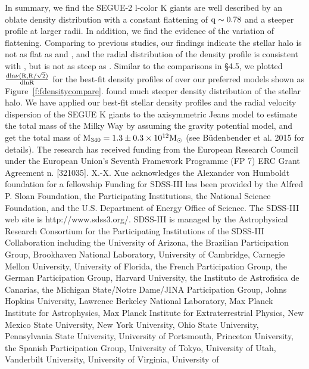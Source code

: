 \documentclass[12pt,preprint]{aastex}
\begin{document}
In summary, we find the SEGUE-2 l-color K giants are well described by an oblate density distribution with a constant flattening of $\rm q \sim 0.78$ and a steeper profile at larger radii. In addition, we find the evidence of the variation of flattening. Comparing to previous studies, our findings indicate the stellar halo is not as flat as \citet[;q=0.7]{Sesar2011} and \citet[;q=0.58]{Deason2011}, and the radial distribution of the density profile is consistent with \citet{Sesar2011}, but is not as steep as \citet{Deason2011,Deason2014}.
Similar to the comparisons in \S 4.5, we plotted $\rm \frac{dln\nu(R,R/\sqrt{2})}{dlnR}$ for the best-fit density profiles of \citet{Deason2011,Deason2014} over our preferred models shown as Figure~\ref{f:fdensitycompare}. \citet{Deason2011,Deason2014} found much steeper density distribution of the stellar halo.
We have applied our best-fit stellar density profiles and the radial velocity dispersion of the SEGUE K giants to the axisymmetric Jeans model to estimate the total mass of the Milky Way by assuming the gravity potential model, and get the total mass of $\rm M_{340}=1.3\pm0.3\times10^{12}M_\odot$ (see B\"{u}denbender et al. 2015 for details).
\acknowledgments
The research has received funding from the European Research Council under the European Union's Seventh Framework Programme (FP 7) ERC Grant Agreement n. [321035].
X.-X. Xue acknowledges the Alexander von Humboldt foundation for a fellowship
Funding for SDSS-III has been provided by the Alfred P. Sloan
Foundation, the Participating Institutions, the National Science
Foundation, and the U.S. Department of Energy Office of Science. The
SDSS-III web site is http://www.sdss3.org/.
SDSS-III is managed by the Astrophysical Research Consortium for the
Participating Institutions of the SDSS-III Collaboration including the
University of Arizona, the Brazilian Participation Group, Brookhaven
National Laboratory, University of Cambridge, Carnegie Mellon
University, University of Florida, the French Participation Group, the
German Participation Group, Harvard University, the Instituto de
Astrofisica de Canarias, the Michigan State/Notre Dame/JINA
Participation Group, Johns Hopkins University, Lawrence Berkeley
National Laboratory, Max Planck Institute for Astrophysics, Max Planck
Institute for Extraterrestrial Physics, New Mexico State University,
New York University, Ohio State University, Pennsylvania State
University, University of Portsmouth, Princeton University, the
Spanish Participation Group, University of Tokyo, University of Utah,
Vanderbilt University, University of Virginia, University of
\end{document}
